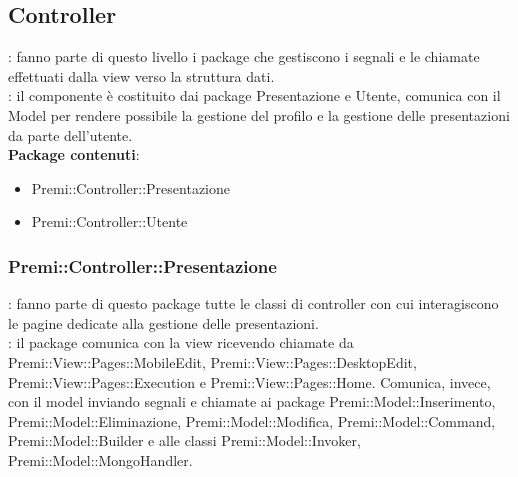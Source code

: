 \subsection{Controller}{
	\textbf{\tipo}: fanno parte di questo livello i package che gestiscono i segnali e le chiamate effettuati dalla view verso la struttura dati.\\
	\textbf{\relaz}: il componente è costituito dai package Presentazione e Utente, comunica con il Model per rendere possibile la gestione del profilo e la gestione delle presentazioni da parte dell'utente.\\
	\textbf{Package contenuti}: 
	\begin{itemize}
	\item Premi::Controller::Presentazione
    \item Premi::Controller::Utente
	\end{itemize}
	\subsubsection{Premi::Controller::Presentazione}{
		\textbf{\tipo}: fanno parte di questo package tutte le classi di controller con cui interagiscono le pagine dedicate alla gestione delle presentazioni.\\
		\textbf{\relaz}: il package comunica con la view ricevendo chiamate da Premi::View::Pages::MobileEdit, Premi::View::Pages::DesktopEdit, Premi::View::Pages::Execution e Premi::View::Pages::Home. Comunica, invece, con il model inviando segnali e chiamate ai package Premi::Model::Inserimento, Premi::Model::Eliminazione, Premi::Model::Modifica, Premi::Model::Command, Premi::Model::Builder e alle classi Premi::Model::Invoker, Premi::Model::MongoHandler.\\
	
	}}
